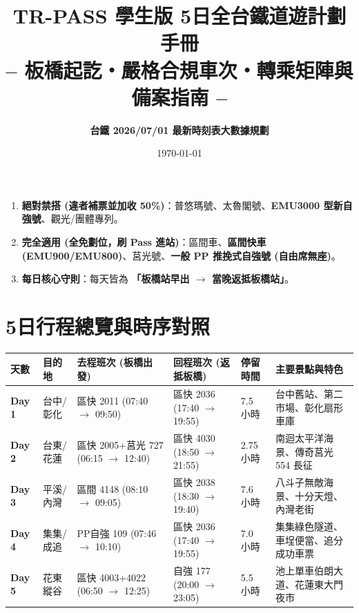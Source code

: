 \documentclass[11pt, a4paper]{article}
\title{\textbf{\Huge TR-PASS 學生版 5日全台鐵道遊計劃手冊}\\[0.3em]
\Large -- 板橋起訖・嚴格合規車次・轉乘矩陣與備案指南 --}
\author{\textbf{台鐵 2026/07/01 最新時刻表大數據規劃}}
\date{\today}
\begin{document}
\maketitle

\begin{tcolorbox}[colback=traBlue!10!white,colframe=traBlue,title=\textbf{TR-PASS 學生版乘車金科玉律 (法規核驗 100\% 合格)}]
\begin{enumerate}
    \item \textbf{絕對禁搭 (違者補票並加收 50\%)}：普悠瑪號、太魯閣號、\textbf{EMU3000 型新自強號}、觀光/團體專列。
    \item \textbf{完全適用 (全免劃位，刷 Pass 進站)}：區間車、\textbf{區間快車 (EMU900/EMU800)}、莒光號、\textbf{一般 PP 推挽式自強號 (自由席無座)}。
    \item \textbf{每日核心守則}：每天皆為 \textbf{「板橋站早出 $\to$ 當晚返抵板橋站」}。
\end{enumerate}
\end{tcolorbox}

\section{5日行程總覽與時序對照}

\begin{table}[h!]
\centering
{}
\begin{tabular}{p{1.2cm}p{1.8cm}p{3.8cm}p{3.8cm}p{1.5cm}p{3.8cm}}
\toprule
\textbf{天數} & \textbf{目的地} & \textbf{去程班次 (板橋出發)} & \textbf{回程班次 (返抵板橋)} & \textbf{停留時間} & \textbf{主要景點與特色} \\
\midrule
\textbf{Day 1} & 台中/彰化 & 區快 2011 (07:40 $\to$ 09:50) & 區快 2036 (17:40 $\to$ 19:55) & 7.5 小時 & 台中舊站、第二市場、彰化扇形車庫 \\
\textbf{Day 2} & 台東/花蓮 & 區快 2005+莒光 727 (06:15 $\to$ 12:40) & 區快 4030 (18:50 $\to$ 21:55) & 2.75 小時 & 南迴太平洋海景、傳奇莒光 554 長征 \\
\textbf{Day 3} & 平溪/內灣 & 區間 4148 (08:10 $\to$ 09:05) & 區快 2038 (18:30 $\to$ 19:40) & 7.6 小時 & 八斗子無敵海景、十分天燈、內灣老街 \\
\textbf{Day 4} & 集集/成追 & PP自強 109 (07:46 $\to$ 10:10) & 區快 2036 (17:40 $\to$ 19:55) & 7.0 小時 & 集集綠色隧道、車埕便當、追分成功車票 \\
\textbf{Day 5} & 花東縱谷 & 區快 4003+4022 (06:50 $\to$ 12:25) & 自強 177 (20:00 $\to$ 23:05) & 5.5 小時 & 池上單車伯朗大道、花蓮東大門夜市 \\
\bottomrule
\end{tabular}
\end{table}
\end{document}
